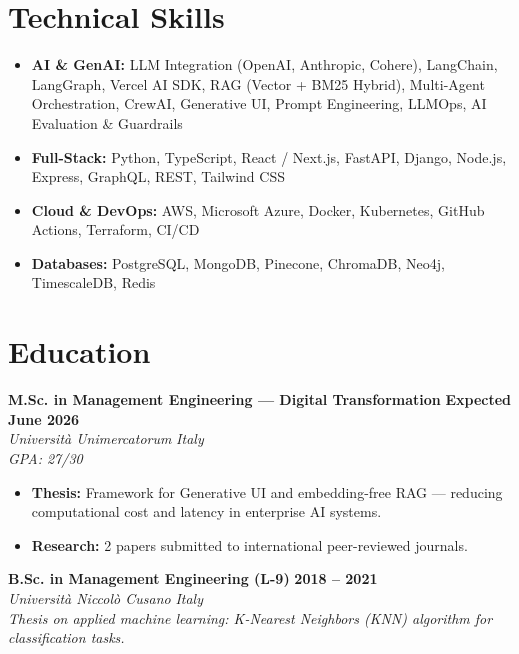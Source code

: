 \documentclass[11pt, letterpaper]{article}
\begin{document}
\section*{Technical Skills}
\begin{itemize}
    \item \textbf{AI \& GenAI:} LLM Integration (OpenAI, Anthropic, Cohere), LangChain, LangGraph, Vercel AI SDK, RAG (Vector + BM25 Hybrid), Multi-Agent Orchestration, CrewAI, Generative UI, Prompt Engineering, LLMOps, AI Evaluation \& Guardrails
    \item \textbf{Full-Stack:} Python, TypeScript, React / Next.js, FastAPI, Django, Node.js, Express, GraphQL, REST, Tailwind CSS
    \item \textbf{Cloud \& DevOps:} AWS, Microsoft Azure, Docker, Kubernetes, GitHub Actions, Terraform, CI/CD
    \item \textbf{Databases:} PostgreSQL, MongoDB, Pinecone, ChromaDB, Neo4j, TimescaleDB, Redis
\end{itemize}

\section*{Education}

\noindent \textbf{M.Sc. in Management Engineering --- Digital Transformation} \hfill \textbf{Expected June 2026} \\
\textit{Universit\`a Unimercatorum} \hfill \textit{Italy} \\
\textit{GPA: 27/30}
\vspace{2pt}
\begin{itemize}
    \item \textbf{Thesis:} Framework for Generative UI and embedding-free RAG --- reducing computational cost and latency in enterprise AI systems.
    \item \textbf{Research:} 2 papers submitted to international peer-reviewed journals.
\end{itemize}

\vspace{8pt}

\noindent \textbf{B.Sc. in Management Engineering (L-9)} \hfill \textbf{2018 -- 2021} \\
\textit{Universit\`a Niccol\`o Cusano} \hfill \textit{Italy} \\
\textit{Thesis on applied machine learning: K-Nearest Neighbors (KNN) algorithm for classification tasks.}
\end{document}
